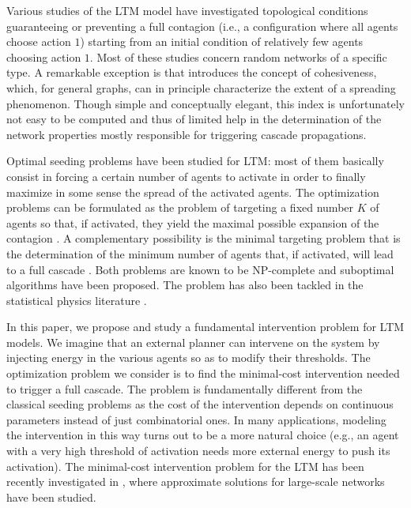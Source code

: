 \documentclass[12pt,twoside,reqno]{amsart}
\theoremstyle{definition}
\numberwithin{equation}{section}
\newcommand{\0}{\mathbf{0}}
\newcommand{\1}{\mathbf{1}}
\begin{document}
Various studies of the LTM model \cite{sM:2000, hA:2010, mL:2012, Moharrami:2016:EC, Rossi.ea:2019, Ravazzi.ea:23, Messina.ea:24} have investigated topological conditions guaranteeing or preventing a full contagion (i.e., a configuration where all agents choose action $1$) starting from an initial condition of relatively few agents choosing action $1$. Most of these studies concern random networks of a specific type. A remarkable exception is \cite{sM:2000} that introduces the concept of cohesiveness, which, for general graphs, can in principle characterize the extent of a spreading phenomenon. Though simple and conceptually elegant, this index is unfortunately not easy to be computed and thus of limited help in the determination of the network properties mostly responsible for triggering cascade propagations.

Optimal seeding problems have been studied for LTM: most of them basically consist in forcing a certain number of agents to activate in order to finally maximize in some sense the spread of the activated agents. The optimization problems can be formulated as the problem of targeting a fixed number $K$ of agents so that, if activated, they yield the maximal possible expansion of the contagion \cite{KKT:2003, CYZ:2010,GLS:2011} . A complementary possibility is the minimal targeting problem that is the determination of the minimum number of agents that, if activated, will lead to a full cascade \cite{Durand:2022}. Both problems are known to be NP-complete and suboptimal algorithms have been proposed. The problem has also been tackled in the statistical physics literature \cite{Altarelli.et.al:2013,Guggiola.Semerjian:2015, Sen.et.al:2017}. 

In this paper, we propose and study a fundamental intervention problem for LTM models. We imagine that an external planner can intervene on the system by injecting energy in the various agents so as to modify their thresholds. The optimization problem we consider is to find the minimal-cost intervention needed to trigger a full cascade. The problem is fundamentally different from the classical seeding problems as the cost of the intervention depends on continuous parameters instead of just combinatorial ones. In many applications, modeling the intervention in this way turns out to be a more natural choice (e.g., an agent with a very high threshold of activation needs more external energy to push its activation). The   minimal-cost intervention problem for the LTM has been recently investigated in \cite{Cianfanelli.ea:2026}, where approximate solutions for large-scale networks have been studied. 
\end{document}
